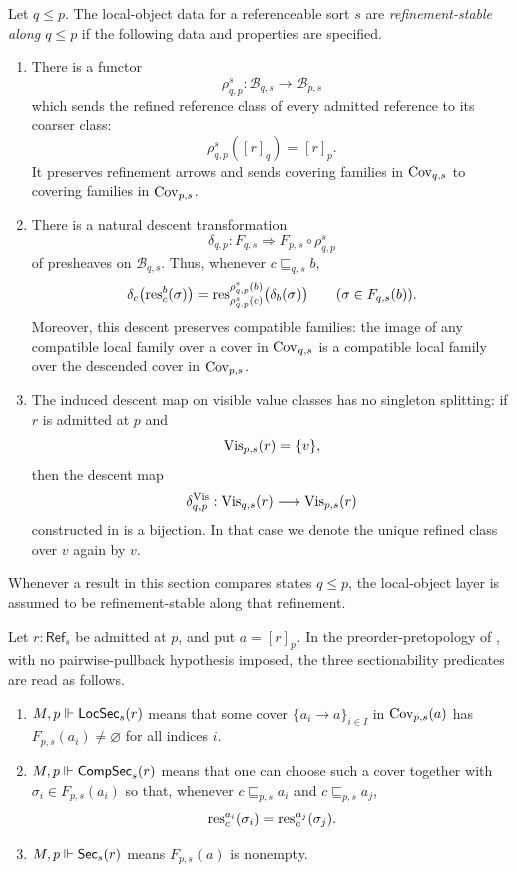 \begin{definition}\label{def:refinement-stable-local-object-layer}
Let $q\le p$. The local-object data for a referenceable sort $s$ are
\emph{refinement-stable along $q\le p$} if the following data and properties
are specified.
\begin{enumerate}[label=(\roman*),nosep]
\item There is a functor
\[
\rho_{q,p}^s:\mathcal B_{q,s}\longrightarrow \mathcal B_{p,s}
\]
which sends the refined reference class of every admitted reference to its
coarser class:
\[
\rho_{q,p}^s([r]_q)=[r]_p.
\]
It preserves refinement arrows and sends covering families in
$\mathrm{Cov}_{q,s}$ to covering families in $\mathrm{Cov}_{p,s}$.
\item There is a natural descent transformation
\[
\delta_{q,p}:F_{q,s}\Longrightarrow F_{p,s}\circ \rho_{q,p}^s
\]
of presheaves on $\mathcal B_{q,s}$. Thus, whenever
$c\sqsubseteq_{q,s} b$,
\[
\delta_c\bigl(\mathrm{res}_c^b(\sigma)\bigr)
=
\mathrm{res}_{\rho_{q,p}^s(c)}^{\rho_{q,p}^s(b)}\bigl(\delta_b(\sigma)\bigr)
\qquad(\sigma\in F_{q,s}(b)).
\]
Moreover, this descent preserves compatible families: the image of any
compatible local family over a cover in $\mathrm{Cov}_{q,s}$ is a compatible local
family over the descended cover in $\mathrm{Cov}_{p,s}$.
\item The induced descent map on visible value classes has no singleton
splitting: if $r$ is admitted at $p$ and
\[
\mathrm{Vis}_{p,s}(r)=\{v\},
\]
then the descent map
\[
\delta_{q,p}^{\mathrm{Vis}}:\mathrm{Vis}_{q,s}(r)\longrightarrow \mathrm{Vis}_{p,s}(r)
\]
constructed in  is a bijection.
In that case we denote the unique refined class over $v$ again by $v$.
\end{enumerate}
Whenever a result in this section compares states $q\le p$, the local-object
layer is assumed to be refinement-stable along that refinement.
\end{definition}

\begin{definition}\label{def:existence-levels}
Let $r:\mathsf{Ref}_s$ be admitted at $p$, and put $a=[r]_p$. In the
preorder-pretopology of , with no
pairwise-pullback hypothesis imposed, the three sectionability predicates are
read as follows.
\begin{enumerate}[label=(\roman*),nosep]
\item $M,p\Vdash \mathsf{LocSec}_s(r)$ means that some cover
$\{a_i\to a\}_{i\in I}$ in $\mathrm{Cov}_{p,s}(a)$ has
$F_{p,s}(a_i)\neq\varnothing$ for all indices $i$.
\item $M,p\Vdash \mathsf{CompSec}_s(r)$ means that one can choose such a cover together
with $\sigma_i\in F_{p,s}(a_i)$ so that, whenever
$c\sqsubseteq_{p,s}a_i$ and $c\sqsubseteq_{p,s}a_j$,
\[
\mathrm{res}_c^{a_i}(\sigma_i)=\mathrm{res}_c^{a_j}(\sigma_j).
\]
\item $M,p\Vdash \mathsf{Sec}_s(r)$ means $F_{p,s}(a)$ is nonempty.
\end{enumerate}
\end{definition}

